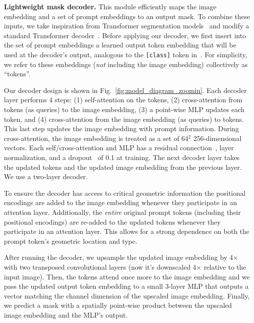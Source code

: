 \documentclass[10pt,twocolumn,letterpaper]{article}
\renewcommand{\paragraph}[1]{\vspace{1.25mm}\noindent\textbf{#1}}
\newcommand{\x}{{\times}}
\newcommand{\fig}[1]{Fig.~\ref{#1}}
\begin{document}
\paragraph{Lightweight mask decoder.} This module efficiently maps the image embedding and a set of prompt embeddings to an output mask. To combine these inputs, we take inspiration from Transformer segmentation models~\cite{Carion2020,cheng2021per} and modify a standard Transformer decoder~\cite{Vaswani2017}. Before applying our decoder, we first insert into the set of prompt embeddings a learned output token embedding that will be used at the decoder's output, analogous to the \texttt{[class]} token in~\cite{Dosovitskiy2021}. For simplicity, we refer to these embeddings (\emph{not} including the image embedding) collectively as ``tokens''.

Our decoder design is shown in \fig{fig:model_diagram_zoomin}. Each decoder layer performs 4 steps: (1) self-attention on the tokens, (2) cross-attention from tokens (as queries) to the image embedding, (3) a point-wise MLP updates each token, and (4) cross-attention from the image embedding (as queries) to tokens. This last step updates the image embedding with prompt information. During cross-attention, the image embedding is treated as a set of 64$^\textrm{2}$ 256-dimensional vectors. Each self/cross-attention and MLP has a residual connection~\cite{He2016}, layer normalization, and a dropout~\cite{Srivastava2014} of 0.1 at training. The next decoder layer takes the updated tokens and the updated image embedding from the previous layer. We use a two-layer decoder.

To ensure the decoder has access to critical geometric information the positional encodings are added to the image embedding whenever they participate in an attention layer. Additionally, the \emph{entire} original prompt tokens (including their positional encodings) are re-added to the updated tokens whenever they participate in an attention layer. This allows for a strong dependence on both the prompt token's geometric location and type.

After running the decoder, we upsample the updated image embedding by 4$\x$ with two transposed convolutional layers (now it's downscaled 4$\x$ relative to the input image). Then, the tokens attend once more to the image embedding and we pass the updated output token embedding to a small 3-layer MLP that outputs a vector matching the channel dimension of the upscaled image embedding. Finally, we predict a mask with a spatially point-wise product between the upscaled image embedding and the MLP's output.
\end{document}

